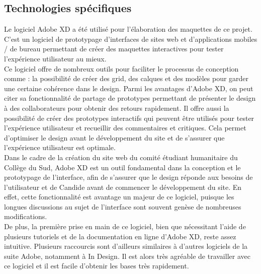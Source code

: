 \documentclass[a4,10pt,french]{sphinxmanual}
\begin{document}
\subsection{Technologies spécifiques}
\label{\detokenize{chapitre-02:technologies-specifiques}}
\sphinxAtStartPar
Le logiciel Adobe XD a été utilisé pour l’élaboration des maquettes de ce projet. C’est un logiciel de prototypage d’interfaces de sites web et d’applications mobiles / de bureau permettant de créer des maquettes interactives pour tester l’expérience utilisateur au mieux.\\
Ce logiciel offre de nombreux outils pour faciliter le processus de conception comme : la possibilité de créer des grid, des calques et des modèles pour garder une certaine cohérence dans le design. Parmi les avantages d’Adobe XD, on peut citer sa fonctionnalité de partage de prototypes permettant de présenter le design à des collaborateurs pour obtenir des retours rapidement. Il offre aussi la possibilité de créer des prototypes interactifs qui peuvent être utilisés pour tester l’expérience utilisateur et recueillir des commentaires et critiques. Cela permet d’optimiser le design avant le développement du site et de s’assurer que l’expérience utilisateur est optimale.\\
Dans le cadre de la création du site web du comité étudiant humanitaire du Collège du Sud, Adobe XD est un outil fondamental dans la conception et le prototypage de l’interface, afin de s’assurer que le design réponde aux besoins de l’utilisateur et de Candide avant de commencer le développement du site. En effet, cette fonctionnalité est avantage un majeur de ce logiciel, puisque les longues discussions au sujet de l’interface sont souvent genèse de nombreuses modifications.\\
De plus, la première prise en main de ce logiciel, bien que nécessitant l’aide de plusieurs tutoriels et de la documentation en ligne d’Adobe XD, reste assez intuitive. Plusieurs raccourcis sont d’ailleurs similaires à d’autres logiciels de la suite Adobe, notamment à In Design. Il est alors très agréable de travailler avec ce logiciel et il est facile d’obtenir les bases très rapidement.
\end{document}

